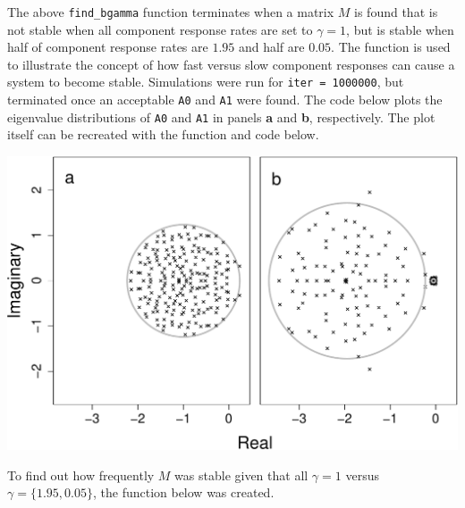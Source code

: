 \documentclass[]{article}
\begin{document}
The above \texttt{find\_bgamma} function terminates when a matrix \(M\)
is found that is not stable when all component response rates are set to
\(\gamma = 1\), but is stable when half of component response rates are
\(1.95\) and half are \(0.05\). The function is used to illustrate the
concept of how fast versus slow component responses can cause a system
to become stable. Simulations were run for \texttt{iter\ =\ 1000000},
but terminated once an acceptable \texttt{A0} and \texttt{A1} were
found. The code below plots the eigenvalue distributions of \texttt{A0}
and \texttt{A1} in panels \textbf{a} and \textbf{b}, respectively. The
plot itself can be recreated with the function and code below.

\includegraphics{unnamed-chunk-4-1.pdf}

To find out how frequently \(M\) was stable given that all
\(\gamma = 1\) versus \(\gamma = \{1.95, 0.05\}\), the function below
was created.
\end{document}
